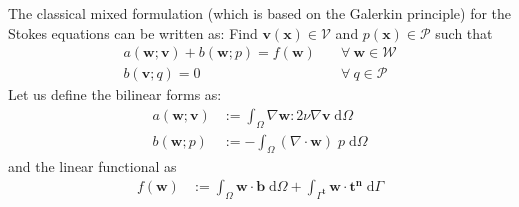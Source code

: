 \documentclass[11pt]{amsart}
\begin{document}
The classical mixed formulation (which is based on the Galerkin principle) for the 
Stokes equations can be written as: Find $\boldsymbol{v}(\boldsymbol{x}) 
\in \mathcal{V}$ and $p(\boldsymbol{x}) \in \mathcal{P}$ such that 
\begin{align}
  \label{Eqn:SNS_CM_Momentum}
  a(\boldsymbol{w};\boldsymbol{v}) + 
  b(\boldsymbol{w};p) = 
  f(\boldsymbol{w}) & \quad \forall \ \boldsymbol{w} \in \mathcal{W} \\
\label{Eqn:SNS_CM_Continuity}
  b(\boldsymbol{v};q) = 0 & \quad \forall \ q \in \mathcal{P}
\end{align}
Let us define the bilinear forms as: 
\begin{align}
  \label{Eqn:SNS_a_Galerkin}
  a(\boldsymbol{w};\boldsymbol{v}) &:= 
  \int_{\Omega} \nabla \boldsymbol{w}:2\nu \nabla 
  \boldsymbol{v} \; \mathrm{d} \Omega \\
\label{Eqn:SNS_b_Galerkin}
  b(\boldsymbol{w};p) &:= 
  -\int_{\Omega} \left(\nabla \cdot \boldsymbol{w}\right)
  \; p \; \mathrm{d} \Omega 
\end{align}
and the linear functional as 
\begin{align}
  \label{Eqn:SNS_f_Galerkin}
  f(\boldsymbol{w}) & := \int_{\Omega} \boldsymbol{w} \cdot 
  \boldsymbol{b} \; \mathrm{d} \Omega + \int_{\Gamma^{\boldsymbol{t}}} 
  \boldsymbol{w} \cdot \boldsymbol{t}^{\boldsymbol{n}} \; \mathrm{d} \Gamma
\end{align}
\end{document}
